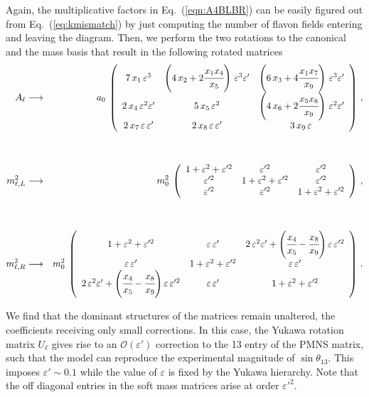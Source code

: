 \documentclass[a4paper,11pt]{article}
\newcommand{\bea}{\begin{eqnarray}}
\newcommand{\eea}{\end{eqnarray}}
\newcommand{\vep}{\varepsilon}
\newcommand{\nn}{\nonumber}
\newcommand{\eq}[1]{Eq.~(\ref{#1})}
\begin{document}
Again, the multiplicative factors in \eq{eqn:A4BLBR} can be easily figured out from \eq{eq:kmismatch} by just computing the number of flavon fields entering and leaving the diagram. Then, we perform the two rotations to the canonical and the mass basis that result in the following rotated matrices
\bea
A_\ell & \longrightarrow & a_{0}\: \left(\begin{array}{ccc}
               7\,x_1\,\vep^3    &  \left(4\,x_2+2\cfrac{x_1 x_4}{x_5}\right)\,\vep^3\vep' & \left(6\,x_3+4\cfrac{x_1 x_7}{x_9}\right)\,\vep^3\vep' \\
               2\,x_4\,\vep^2\vep' &  5\,x_5\,\vep^2        & \left(4\,x_6+2\cfrac{x_5x_8}{x_9}\right)\,\vep^2\vep' \\
               2\,x_7\,\vep\,\vep'     &  2\,x_8\,\vep\,\vep'       & 3\,x_9\,\vep\,   
               \end{array} \right)    \,,\\ 
\nn \\ 
\nn \\               
m_{\ell,L}^2 & \longrightarrow & m_{0}^2\: \left(\begin{array}{ccc}
               1+\vep^2+\vep'^2    &  \vep'^2 & \vep'^2  \\
               \vep'^2  &  1+\vep^2+\vep'^2 & \vep'^2  \\
               \vep'^2     &  \vep'^2    & 1+\vep^2+\vep'^2 
               \end{array} \right)    \,,\\   
\nn \\  
\nn \\             
m_{\ell,R}^2 & \longrightarrow & m_{0}^2\: \left(\begin{array}{ccc}
               1+\vep^2+\vep'^2    &  \vep\,\vep' & 2\,\vep^2\vep' +\left(\cfrac{x_4}{x_5}-\cfrac{x_8}{x_9}\right)\vep\,\vep'^2  \\
               \vep\,\vep'  &  1+\vep^2+\vep'^2 &\vep\,\vep'  \\
              2\,\vep^2\vep' +\left(\cfrac{x_4}{x_5}-\cfrac{x_8}{x_9}\right)\vep\,\vep'^2  &  \vep\,\vep'    & 1+\vep^2+\vep'^2    
               \end{array} \right)    \,.\nn\\
\eea

We find that the dominant structures of the matrices remain unaltered, the coefficients receiving only small corrections. In this case, the Yukawa rotation matrix $U_\ell$ gives rise to an $\mathcal{O}(\vep')$ correction to the 13 entry of the PMNS matrix, such that the model can reproduce the experimental magnitude of $\sin\theta_{13}$.  This imposes $\vep' \sim 0.1$ while the value of $\vep$ is fixed by the Yukawa hierarchy. Note that the off diagonal entries in the soft mass matrices arise at order $\vep'^2$. 
\end{document}
